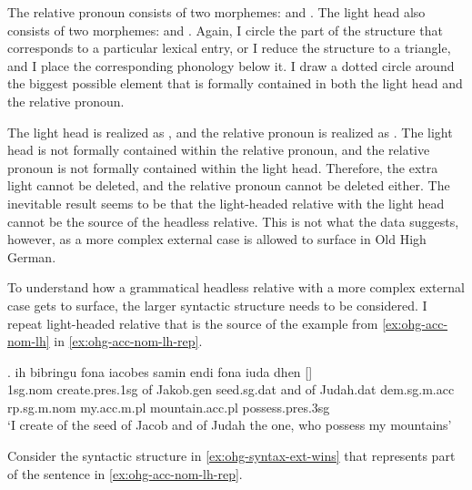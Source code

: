 The relative pronoun consists of two morphemes:  and .
The light head also consists of two morphemes:  and .
Again, I circle the part of the structure that corresponds to a particular lexical entry, or I reduce the structure to a triangle, and I place the corresponding phonology below it.
I draw a dotted circle around the biggest possible element that is formally contained in both the light head and the relative pronoun.

The light head is realized as , and the relative pronoun is realized as .
The light head is not formally contained within the relative pronoun, and the relative pronoun is not formally contained within the light head.
Therefore, the extra light cannot be deleted, and the relative pronoun cannot be deleted either.
The inevitable result seems to be that the light-headed relative with the light head cannot be the source of the headless relative.
This is not what the data suggests, however, as a more complex external case is allowed to surface in Old High German.

To understand how a grammatical headless relative with a more complex external case gets to surface, the larger syntactic structure needs to be considered. I repeat light-headed relative that is the source of the example from \ref{ex:ohg-acc-nom-lh} in \ref{ex:ohg-acc-nom-lh-rep}.

\exg. ih bibringu fona iacobes samin endi fona iuda dhen []   \\
1\ac{sg}.\ac{nom} {create}.\ac{pres}.1\ac{sg}\scsub{[acc]} of Jakob.\ac{gen} seed.\ac{sg}.\ac{dat} and of Judah.\ac{dat} \ac{dem}.\ac{sg}.\ac{m}.\ac{acc} \ac{rp}.\ac{sg}.\ac{m}.\ac{nom} my.\ac{acc}.\ac{m}.\ac{pl} mountain.\ac{acc}.\ac{pl} possess.\ac{pres}.3\ac{sg}\scsub{[nom]}\\
`I create of the seed of Jacob and of Judah the one, who possess my mountains' \label{ex:ohg-acc-nom-lh-rep}

Consider the syntactic structure in \ref{ex:ohg-syntax-ext-wins} that represents part of the sentence in \ref{ex:ohg-acc-nom-lh-rep}.

